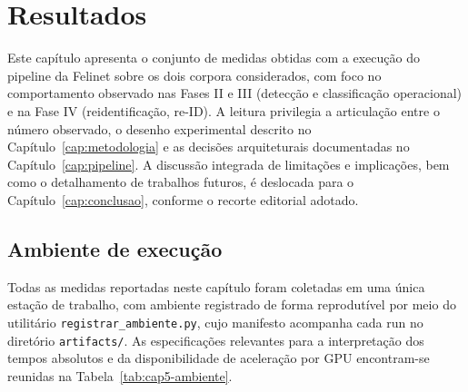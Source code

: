 
\chapter{Resultados}
\label{cap:resultados}

Este capítulo apresenta o conjunto de medidas obtidas com a execução do pipeline da Felinet sobre os dois corpora considerados, com foco no comportamento observado nas Fases II e III (detecção e classificação operacional) e na Fase IV (reidentificação, re-ID). A leitura privilegia a articulação entre o número observado, o desenho experimental descrito no Capítulo~\ref{cap:metodologia} e as decisões arquiteturais documentadas no Capítulo~\ref{cap:pipeline}. A discussão integrada de limitações e implicações, bem como o detalhamento de trabalhos futuros, é deslocada para o Capítulo~\ref{cap:conclusao}, conforme o recorte editorial adotado.

\section{Ambiente de execução}
\label{sec:res-ambiente}

Todas as medidas reportadas neste capítulo foram coletadas em uma única estação de trabalho, com ambiente registrado de forma reprodutível por meio do utilitário \texttt{registrar\_ambiente.py}, cujo manifesto acompanha cada run no diretório \texttt{artifacts/}. As especificações relevantes para a interpretação dos tempos absolutos e da disponibilidade de aceleração por GPU encontram-se reunidas na Tabela~\ref{tab:cap5-ambiente}.

